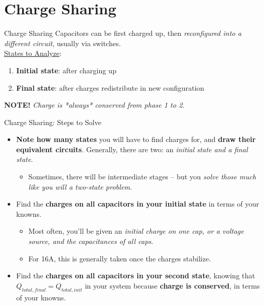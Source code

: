 \section{Charge Sharing}

\begin{frame}{Charge Sharing}
    Capacitors can be first charged up, then \textit{reconfigured into a different circuit}, usually via switches. \\[5pt]
    \underline{States to Analyze}:
    \begin{enumerate}
        \item \textbf{Initial state}: after charging up
        \item \textbf{Final state}: after charges redistribute in new configuration
    \end{enumerate}

    \textbf{NOTE!} \textit{Charge is *always* conserved from phase 1 to 2.}
\end{frame}

\begin{frame}{Charge Sharing: Steps to Solve}
    \begin{itemize}
        \item\textbf{Note how many states} you will have to find charges for, and \textbf{draw their equivalent circuits}. Generally, there are two: an \textit{initial state and a final state}. 
        \begin{itemize}
            \item Sometimes, there will be intermediate stages -- but you \textit{solve those much like you will a two-state problem}.
        \end{itemize}
        \item Find the \textbf{charges on all capacitors in your initial state} in terms of your knowns.
        \begin{itemize}
            \item Most often, you’ll be given an \textit{initial charge on one cap, or a voltage source, and the capacitances of all caps}. 
            \item For 16A, this is generally taken once the charges stabilize.
        \end{itemize}
        \item Find the \textbf{charges on all capacitors in your second state}, knowing that $Q_{total, final} = Q_{total, init}$ in your system because \textbf{charge is conserved}, in terms of your knowns.
    \end{itemize}
\end{frame}

